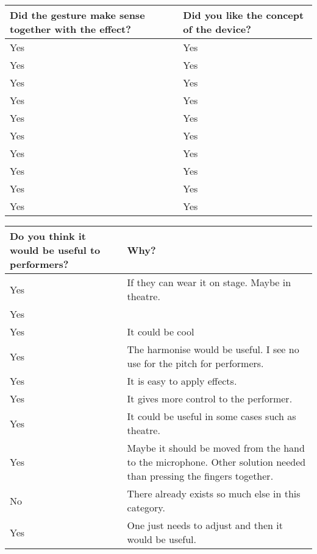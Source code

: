 \begin{tabular}{| p{5cm} | p{5cm} |}
\hline
Did the gesture make sense together with the effect? & Did you like the concept of the device?  \\ \hline
Yes & Yes  \\ \hline
Yes & Yes   \\ \hline
Yes & Yes \\ \hline
Yes & Yes  \\ \hline
Yes & Yes \\ \hline
Yes & Yes  \\ \hline
Yes & Yes  \\ \hline
Yes & Yes  \\ \hline
Yes & Yes \\ \hline
Yes & Yes \\ \hline
\end{tabular}

\begin{tabular}{| p{5cm} | p{5cm} |}
\hline
Do you think it would be useful to performers? & Why? \\ \hline
Yes & If they can wear it on stage. Maybe in theatre. \\ \hline
Yes &  \\ \hline
Yes & It could be cool \\ \hline
Yes & The harmonise would be useful. I see no use for the pitch for performers. \\ \hline
Yes & It is easy to apply effects.  \\ \hline
Yes & It gives more control to the performer. \\ \hline
Yes & It could be useful in some cases such as theatre. \\ \hline
Yes & Maybe it should be moved from the hand to the microphone. Other solution needed than pressing the fingers together. \\ \hline
No & There already exists so much else in this category.  \\ \hline
Yes & One just needs to adjust and then it would be useful. \\ \hline
\end{tabular}

